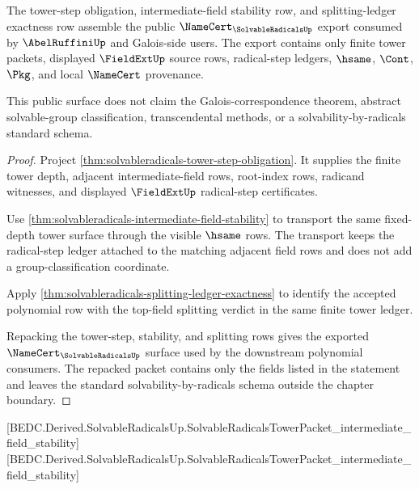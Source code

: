 \begin{theorem}
\label{thm:solvableradicals-public-namecert-export}
The tower-step obligation, intermediate-field stability row, and
splitting-ledger exactness row assemble the public
$\NameCert_{\SolvableRadicalsUp}$ export consumed by $\AbelRuffiniUp$ and
Galois-side users. The export contains only finite tower packets, displayed
$\FieldExtUp$ source rows, radical-step ledgers, $\hsame$, $\Cont$, $\Pkg$,
and local $\NameCert$ provenance.

This public surface does not claim the Galois-correspondence theorem,
abstract solvable-group classification, transcendental methods, or a
solvability-by-radicals standard schema.
\end{theorem}
\begin{proof}
Project \autoref{thm:solvableradicals-tower-step-obligation}. It supplies the
finite tower depth, adjacent intermediate-field rows, root-index rows,
radicand witnesses, and displayed $\FieldExtUp$ radical-step certificates.

Use \autoref{thm:solvableradicals-intermediate-field-stability} to transport
the same fixed-depth tower surface through the visible $\hsame$ rows. The
transport keeps the radical-step ledger attached to the matching adjacent
field rows and does not add a group-classification coordinate.

Apply \autoref{thm:solvableradicals-splitting-ledger-exactness} to identify
the accepted polynomial row with the top-field splitting verdict in the same
finite tower ledger.

Repacking the tower-step, stability, and splitting rows gives the exported
$\NameCert_{\SolvableRadicalsUp}$ surface used by the downstream polynomial
consumers. The repacked packet contains only the fields listed in the
statement and leaves the standard solvability-by-radicals schema outside the
chapter boundary.
\end{proof}

[BEDC.Derived.SolvableRadicalsUp.SolvableRadicalsTowerPacket\_intermediate\_field\_stability]
[BEDC.Derived.SolvableRadicalsUp.SolvableRadicalsTowerPacket\_intermediate\_field\_stability]

